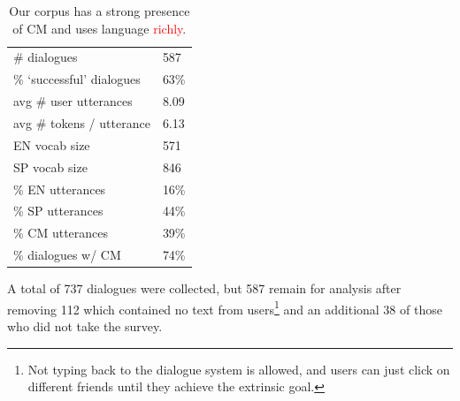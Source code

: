 \documentclass[11pt,a4paper]{article}
\newcommand{\red}[1]{\textcolor{red}{#1}}
\begin{document}
\begin{table}[]
\centering
\begin{tabular}{ll}  %
\hline
\# dialogues                     & 587    \\ %
\% `successful' dialogues        & 63\%   \\ %
avg \# user utterances           & 8.09   \\ %
avg \# tokens / utterance        & 6.13   \\ %
EN vocab size                    & 571    \\ %
SP vocab size                    &  846    \\ %
\% EN utterances                 & 16\%   \\ %
\% SP utterances                 & 44\%   \\ %
\% CM utterances                 & 39\%   \\ %
\% dialogues w/ CM               & 74\% \\ %
\hline
\end{tabular}
\caption{Our corpus has a strong presence of CM and uses language \red{richly}.}
\label{tab:overview-stats}
\end{table}

A total of 737 dialogues were collected, but 587 remain for analysis after removing 112 which contained no text from users\footnote{Not typing back to the dialogue system is allowed, and users can just click on different friends until they achieve the extrinsic goal.} and an additional 38 of those who did not take the survey.
\end{document}
